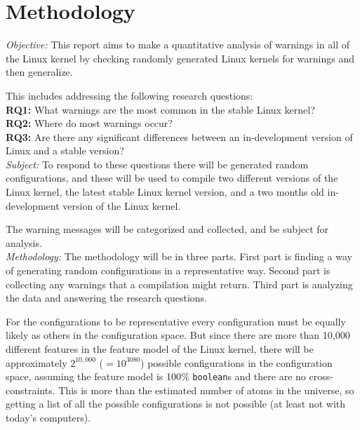 \documentclass[a4paper,11pt]{report}
\begin{document}
\chapter{Methodology}

\emph{Objective:}
This report aims to make a quantitative analysis of warnings in all of the
Linux kernel by checking randomly generated Linux kernels for warnings and 
then generalize.

This includes addressing the following research questions:
\\

\textbf{RQ1:} What warnings are the most common in the stable Linux kernel?
\\

\textbf{RQ2:} Where do most warnings occur?
\\

\textbf{RQ3:} Are there any significant differences between an in-development 
version of Linux and a stable version?
\\

\emph{Subject:}
To respond to these questions there will be generated random configurations, 
and these will be used to compile two different versions of the Linux kernel, 
the latest stable Linux kernel version, and a two months old in-development 
version of the Linux kernel.

The warning messages will be categorized and collected, and be subject for 
analysis.
\\

\emph{Methodology:}
The methodology will be in three parts. First part is finding a way of
generating random configurations in a representative way. Second part is 
collecting any warnings that a compilation might return. Third part is 
analyzing the data and answering the research questions.
\\

        \def \fn{Not counting cross-tree contraints, but also saying 
        everything is a \texttt{boolean} and not \texttt{tristate}, or 
        \texttt{string}.}

For the configurations to be representative every configuration must be equally 
likely as others in the configuration space. But since there are more than 
10,000 different features in the feature model of the Linux kernel, there will 
be approximately $2^{10,000}$ ($=10^{3080}$) possible configurations in the 
configuration space, assuming the feature model is 100\% \texttt{boolean}s and 
there are no cross-constraints.  This is more than the estimated number of 
atoms in the universe, so getting a list of all the possible configurations is 
not possible (at least not with today's computers).
\end{document}
